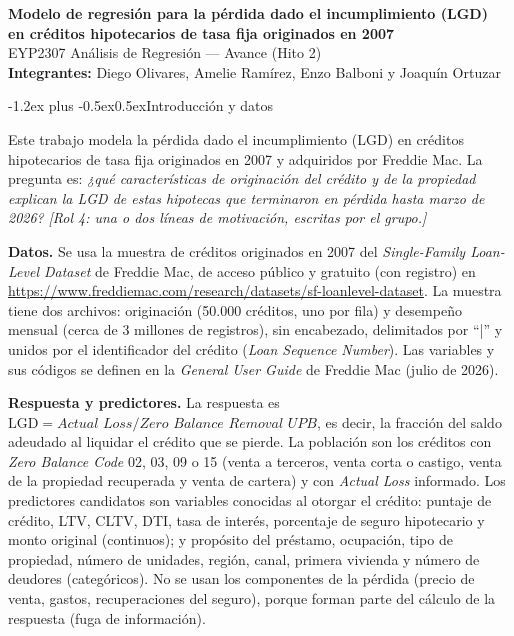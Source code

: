 \documentclass[10pt]{article}
\makeatletter
\renewcommand{\section}{\@startsection{section}{1}{0pt}%
  {-1.2ex plus -0.5ex}{0.5ex}{\normalfont\large\bfseries}}
\makeatother
\begin{document}
\begin{center}
  {\large\bfseries Modelo de regresión para la pérdida dado el incumplimiento (LGD)\\
  en créditos hipotecarios de tasa fija originados en 2007}\\[2pt]
  EYP2307 Análisis de Regresión --- Avance (Hito 2)\\
  \textbf{Integrantes:} Diego Olivares, Amelie Ramírez, Enzo Balboni y Joaquín Ortuzar
\end{center}

\section{Introducción y datos}

Este trabajo modela la pérdida dado el incumplimiento (LGD) en créditos hipotecarios de
tasa fija originados en 2007 y adquiridos por Freddie Mac. La pregunta es: \emph{¿qué
características de originación del crédito y de la propiedad explican la LGD de estas
hipotecas que terminaron en pérdida hasta marzo de 2026?}
\textit{[Rol 4: una o dos líneas de motivación, escritas por el grupo.]}

\textbf{Datos.} Se usa la muestra de créditos originados en 2007 del \emph{Single-Family
Loan-Level Dataset} de Freddie Mac, de acceso público y gratuito (con registro) en
\url{https://www.freddiemac.com/research/datasets/sf-loanlevel-dataset}.
La muestra tiene
dos archivos: originación (50.000 créditos, uno por fila) y desempeño mensual (cerca de
3 millones de registros), sin encabezado, delimitados por ``|'' y unidos por el
identificador del crédito (\emph{Loan Sequence Number}). Las variables y sus códigos se
definen en la \emph{General User Guide} de Freddie Mac (julio de 2026).

\textbf{Respuesta y predictores.} La respuesta es
$\mathrm{LGD} = \textit{Actual Loss} / \textit{Zero Balance Removal UPB}$, es decir, la
fracción del saldo adeudado al liquidar el crédito que se pierde. La población son los
créditos con \emph{Zero Balance Code} 02, 03, 09 o 15 (venta a terceros, venta corta o
castigo, venta de la propiedad recuperada y venta de cartera) y con \emph{Actual Loss}
informado. Los predictores candidatos son variables conocidas al otorgar el crédito:
puntaje de crédito, LTV, CLTV, DTI, tasa de interés, porcentaje de seguro hipotecario y
monto original (continuos); y propósito del préstamo, ocupación, tipo de propiedad, número
de unidades, región, canal, primera vivienda y número de deudores (categóricos). No se usan
los componentes de la pérdida (precio de venta, gastos, recuperaciones del seguro), porque
forman parte del cálculo de la respuesta (fuga de información).
\end{document}
